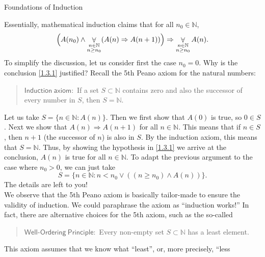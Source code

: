 \documentclass[smaller,hyperref={CJKbookmarks=true}]{beamer}
\newcommand{\N}{\mathbb{N}} \newcommand{\Z}{\mathbb{Z}} \newcommand{\Q}{\mathbb{Q}}
\begin{document}
\begin{frame}{Foundations of Induction}
\begin{spacing}{1.05}
Essentially, mathematical induction claims that for all $n_0\in\N$,
\setcounter{equation}{0}
\begin{equation}\label{1.3.1}
\Big(A(n_0)\wedge\mathop{\forall}_{\begin{subarray}{c}
                                      n\in\N\\
                                      n\geq n_0
                                    \end{subarray}}(A(n)\Rightarrow A(n+1))\Big)\Rightarrow\mathop{\forall}_{\begin{subarray}{c}
                                      n\in\N\\
                                      n\geq n_0
                                    \end{subarray}}A(n).
\end{equation}
To simplify the discussion, let us consider first the case $n_0=0$. Why is the conclusion \eqref{1.3.1} justified? Recall the 5th Peano axiom for the natural numbers:
\begin{quote}
  \alert{$\mathsf{Induction~ axiom\!:}$} If a set $S\subset\N$ contains zero and also the successor of every number in $S$, then $S=\N$.
\end{quote}
Let us take $S=\{n\in\N\!:A(n)\}$. Then we first show that $A(0)$ is true, so $0\in S$. Next we show that $A(n)\Rightarrow A(n+1)$ for all $n\in\N$. This means that if $n\in S$, then $n+1$ (the successor of $n$) is also in $S$. By the induction axiom, this means that $S=\N$. Thus, by showing the hypothesis in \eqref{1.3.1} we arrive at the conclusion, $A(n)$ is true for all $n\in\N$.
\newpage
To adapt the previous argument to the case where $n_0>0$, we can just take
\[S=\{n\in\N\!:n<n_0\vee((n\geq n_0)\wedge A(n))\}.\]
The details are left to you!\\[5pt]
We observe that the 5th Peano axiom is basically tailor-made to ensure
the validity of induction. We could paraphrase the axiom as ``induction
works!'' In fact, there are alternative choices for the 5th axiom, such as
the so-called\\[3pt]
\begin{quote}
  \alert{$\mathsf{Well\text{-}Ordering~Principle\!:}$} Every non-empty set $S\subset\N$ has a least element.
\end{quote}
This axiom assumes that we know what ``least'', or, more precisely, ``less

\end{spacing}
\end{frame}
\end{document}
